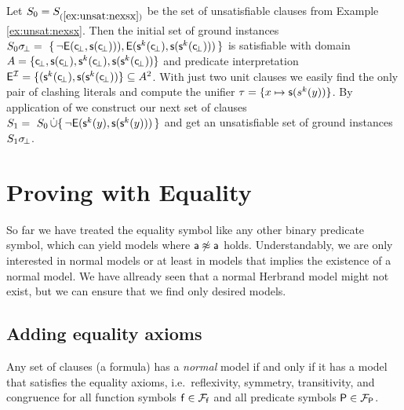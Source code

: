 \begin{example}\label{ex:unsat2}
Let \(S_0 = S_{(\ref{ex:unsat:nexsx})}\) be the set of unsatisfiable clauses from Example \ref{ex:unsat:nexsx}.
Then the initial set of ground instances
$S_0\sigma\!_\bot =\
\{\,
{ \lnot\mathsf{E}(\mathsf{c}\!_\bot, \mathsf{s}(\mathsf{c}\!_\bot)))},
{ \mathsf{E}(\mathsf{s}^k(\mathsf{c}\!_\bot), \mathsf{s}(\mathsf{s}^k(\mathsf{c}\!_\bot)))}
\,\}$
is satisfiable with domain \(A = \{ \mathsf{c}\!_\bot, \mathsf{s}(\mathsf{c}\!_\bot), \mathsf{s}^k(\mathsf{c}\!_\bot), \mathsf{s}(\mathsf{s}^k(\mathsf{c}\!_\bot)) \}\)
and predicate interpretation
$\mathsf{E}^{\mathcal{I}} = \{ (\mathsf{s}^k(\mathsf{c}\!_\bot), \mathsf{s}(\mathsf{s}^k(\mathsf{c}\!_\bot))
 \} \subseteq A^2$.
%
 With just two unit clauses we easily find the only pair of clashing literals and compute the unifier
 \(\tau = \{ x\mapsto \mathsf{s}(s^k(y)) \}\).
 By application of \InstGen we construct our next set of clauses
$
S_1 =\
S_0 \mathop{\dot\cup}
 \{\,
 { \lnot\mathsf{E}(\mathsf{s}^k(y), \mathsf{s}(\mathsf{s}^k(y)))}
 \,\}
 $
 and get an unsatisfiable set of ground instances \(S_1\sigma\!_\bot\).
\end{example}




\section{Proving with Equality}\label{sec:proving:with:equality}

So far we have treated the equality symbol like any other binary predicate symbol,
which can yield models where \(\mathsf{a}\not\approx\mathsf{a}\) holds.
Understandably, we are only interested in normal models or
at least in models that implies the existence of a normal model.
We have allready seen that a normal Herbrand model might not exist,
but we can ensure that we find only desired models.

\subsection{Adding equality axioms}\label{sec:equality:axioms}

\begin{theorem}\cite{Harrison:2009:HPL:1540610}
	Any set of clauses (a formula) has a \emph{normal} model
	if and only if it has a model that satisfies the
	{\myem equality axioms}, i.e.~reflexivity, symmetry, transitivity,
	and congruence for all function symbols \(\mathsf{f}\in{\mathcal{F}_{\mathsf{f}}}\)
	and all predicate symbols \(\mathsf{P}\in{\mathcal{F}_{\mathsf{P}}}\).
\end{theorem}


